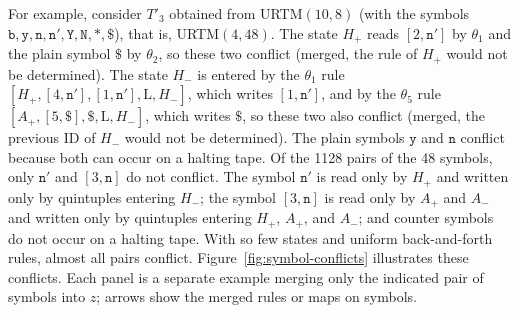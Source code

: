 \documentclass{article}
\theoremstyle{definition}
\theoremstyle{remark}
\newcommand{\rmL}{\mathrm{L}}
\begin{document}
For example, consider $T'_3$ obtained from URTM$(10,8)$ (with the symbols $\mathtt{b},\mathtt{y},\mathtt{n},\mathtt{n}',\mathtt{Y},\mathtt{N},\mathtt{*},\mathtt{\$}$), that is, URTM$(4,48)$.
The state $H_+$ reads $[2,\mathtt{n}']$ by $\theta_1$ and the plain symbol $\mathtt{\$}$ by $\theta_2$, so these two conflict (merged, the rule of $H_+$ would not be determined).
The state $H_-$ is entered by the $\theta_1$ rule $[H_+,[4,\mathtt{n}'],[1,\mathtt{n}'],\rmL,H_-]$, which writes $[1,\mathtt{n}']$, and by the $\theta_5$ rule $[A_+,[5,\mathtt{\$}],\mathtt{\$},\rmL,H_-]$, which writes $\mathtt{\$}$, so these two also conflict (merged, the previous ID of $H_-$ would not be determined).
The plain symbols $\mathtt{y}$ and $\mathtt{n}$ conflict because both can occur on a halting tape.
Of the 1128 pairs of the 48 symbols, only $\mathtt{n}'$ and $[3,\mathtt{n}]$ do not conflict. The symbol $\mathtt{n}'$ is read only by $H_+$ and written only by quintuples entering $H_-$; the symbol $[3,\mathtt{n}]$ is read only by $A_+$ and $A_-$ and written only by quintuples entering $H_+$, $A_+$, and $A_-$; and counter symbols do not occur on a halting tape.
With so few states and uniform back-and-forth rules, almost all pairs conflict.
Figure~\ref{fig:symbol-conflicts} illustrates these conflicts. Each panel is a separate example merging only the indicated pair of symbols into $z$; arrows show the merged rules or maps on symbols.
\end{document}

